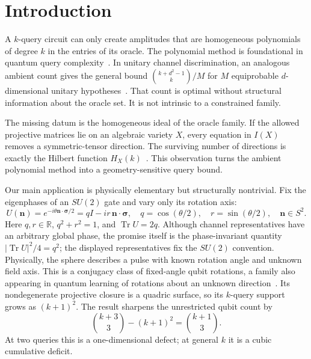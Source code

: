 \documentclass[11pt]{article}
\theoremstyle{definition}
\theoremstyle{remark}
\newcommand{\Tr}{\operatorname{Tr}}
\begin{document}
\section{Introduction}

A $k$-query circuit can only create amplitudes that are homogeneous
polynomials of degree $k$ in the entries of its oracle.  The polynomial method
is foundational in quantum query complexity~\cite{beals2001,sheyuen2023}.  In unitary
channel discrimination, an analogous ambient count gives the general bound
$\binom{k+d^2-1}{k}/M$ for $M$ equiprobable $d$-dimensional unitary
hypotheses~\cite{bavaresco2022}.  That count is optimal without structural
information about the oracle set.  It is not intrinsic to a constrained
family.

The missing datum is the homogeneous ideal of the oracle family.  If the
allowed projective matrices lie on an algebraic variety $X$, every equation
in $I(X)$ removes a symmetric-tensor direction.  The surviving number of
directions is exactly the Hilbert function $H_X(k)$~\cite{eisenbud1995}.  This observation turns
the ambient polynomial method into a geometry-sensitive query bound.

Our main application is physically elementary but structurally nontrivial.
Fix the eigenphases of an $SU(2)$ gate and vary only its rotation axis:
\begin{equation}\label{eq:class}
 U(\bm n)=e^{-i\theta\bm n\cdot\bm\sigma/2}
 =qI-ir\,\bm n\cdot\bm\sigma,
 \quad q=\cos(\theta/2),\quad r=\sin(\theta/2),\quad \bm n\in S^2.
\end{equation}
Here $q,r\in\mathbb R$, $q^2+r^2=1$, and $\Tr U=2q$.  Although channel
representatives have an arbitrary global phase, the promise itself is the
phase-invariant quantity $|\Tr U|^2/4=q^2$; the displayed representatives
fix the $SU(2)$ convention.  Physically, the sphere describes a pulse with
known rotation angle and unknown field axis.  This is a conjugacy class of
fixed-angle qubit rotations, a family also
appearing in quantum learning of rotations about an unknown
direction~\cite{mochiribella2019}.  Its nondegenerate projective closure is a
quadric surface, so its $k$-query support grows as $(k+1)^2$.  The result
sharpens the unrestricted qubit count by
\begin{equation}\label{eq:deficitintro}
 \binom{k+3}{3}-(k+1)^2=\binom{k+1}{3}.
\end{equation}
At two queries this is a one-dimensional defect; at general $k$ it is a
cubic cumulative deficit.
\end{document}

